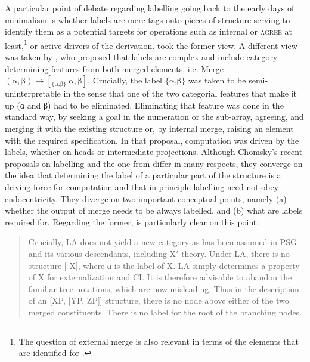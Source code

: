 \documentclass[output=paper]{langsci/langscibook}
\begin{document}
A particular point of debate regarding labelling going back to
the early days of minimalism is whether labels are mere tags onto pieces of
structure serving to identify them as a potential targets for operations such
as internal  or \textsc{agree} at least,\footnote{The question of
external merge is also relevant in terms of the elements that are identified
for .} or active drivers of the derivation.
\citet{Chomsky1993,Chomsky1995} took the former view.  A different view was
taken by \cite{adger-tsoulas:99}, who proposed that labels are complex and
include category determining features from both merged elements, i.e. Merge$(\text{α},
\text{β}) \rightarrow [_{\{\text{α,β}\}}\ \text{α}, \text{β} ]$. Crucially, the label $ \{\text{α,β}\}$ was taken
to be semi-uninterpretable in the sense that one of the two categorial features
that make it up (α and β) had to be eliminated.  Eliminating that feature was
done in the standard way, by seeking a goal in the numeration or the sub-array,
agreeing, and merging it with the existing structure or, by internal merge,
raising an element with the required specification. In that proposal,
computation was driven by the labels, whether on heads or intermediate
projections. Although Chomsky's recent proposals on labelling and the one from
\citet{adger-tsoulas:99} differ in many respects, they converge on the idea
that determining the label of a particular part of the structure is a driving
force for computation and that in principle labelling need not obey
endocentricity.  They diverge on two important conceptual points, namely (a)
whether the output of merge needs to be always labelled, and (b) what are
labels required for. Regarding the former, \citet[6]{Chomsky2015} is
particularly clear on this point:

\begin{quote}

Crucially, \gls{LA} does not yield a new category as has been assumed in PSG
and its various descendants, including X$'$ theory. Under LA, there is no
structure [ X], where α is the label of X. \gls{LA} simply determines a
property of X for externalization and CI. It is therefore advisable to abandon
the familiar tree notations, which are now misleading.  Thus in the description
of an [XP, [YP, ZP]] structure, there is no node above either of the two merged
constituents. There is no label for the root of the branching nodes.

\end{quote}
\end{document}
